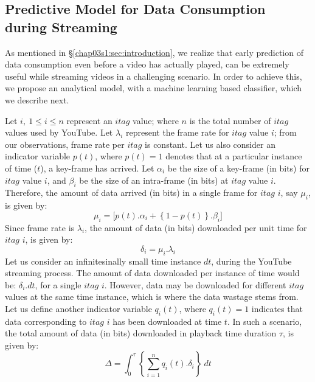 \subsection{Predictive Model for Data Consumption during Streaming}
\label{chap03s1:sec:model}

As mentioned in \S\ref{chap03s1:sec:introduction}, we realize that early prediction of data consumption even before a video has actually played, can be extremely useful while streaming videos in a challenging scenario.
In order to achieve this, we propose an analytical model, with a machine learning based classifier, which we describe next.

Let $i,\ 1 \leq i \leq n$ represent an $itag$ value; where $n$ is the total number of $itag$ values used by YouTube.
Let $\lambda_i$ represent the frame rate for $itag$ value $i$; from our observations, frame rate per $itag$ is constant. 
Let us also consider an indicator variable $p(t)$, where $p(t)=1$ denotes that at a particular instance of time ($t$), a key-frame has arrived.
Let $\alpha_i$ be the size of a key-frame (in bits) for $itag$ value $i$, and $\beta_i$ be the size of an intra-frame (in bits) at $itag$ value $i$.
Therefore, the amount of data arrived (in bits) in a single frame for $itag$ $i$, say $\mu_{i}$, is given by:
\begin{equation}
 \mu_i = \lbrack p(t).\alpha_i + \left\{1-p(t)\right\}.\beta_i \rbrack
\end{equation}
Since frame rate is $\lambda_i$, the amount of data (in bits) downloaded per unit time for $itag$ $i$, is given by:
\begin{equation}
 \delta_i = \mu_i.\lambda_i
\end{equation}
Let us consider an infinitesinally small time instance $dt$, during the YouTube streaming process. The amount of data downloaded per instance of time would be: $\delta_i.dt$, for a single $itag$ $i$.
However, data may be downloaded for different $itag$ values at the same time instance, which is where the data wastage stems from.
Let us define another indicator variable $q_{i}(t)$, where $q_{i}(t)=1$ indicates that data corresponding to $itag$ $i$ has been downloaded at time $t$.
In such a scenario, the total amount of data (in bits) downloaded in playback time duration $\tau$, is given by:
\begin{equation}
 \Delta = \int_{0}^{\tau} \left\{\sum_{i=1}^{n} q_{i}(t).\delta_{i}\right\}\ dt %
\end{equation}

